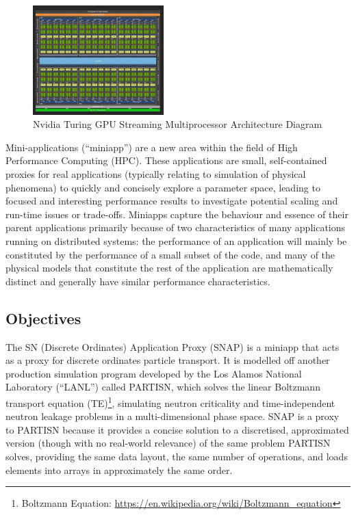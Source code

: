 \documentclass[conference]{IEEEtran}
\begin{document}
\begin{figure}
\centering
\includegraphics[width=0.45\textwidth]{images/gpu_diagram.jpg}
\caption{Nvidia Turing GPU Streaming Multiprocessor Architecture Diagram}
\label{fig:gpu_diagram}
\end{figure}

Mini-applications (``miniapp”) are a new area within the field of High Performance Computing (HPC). These applications are small, self-contained proxies for real applications (typically relating to simulation of physical phenomena) to quickly and concisely explore a parameter space, leading to focused and interesting performance results to investigate potential scaling and run-time issues or trade-offs\cite{miniapps}. Miniapps capture the behaviour and essence of their parent applications primarily because of two characteristics of many applications running on distributed systems: the performance of an application will mainly be constituted by the performance of a small subset of the code, and many of the physical models that constitute the rest of the application are mathematically distinct and generally have similar performance characteristics\cite{miniapps}.

\subsection{Objectives}

The SN (Discrete Ordinates) Application Proxy (SNAP) is a miniapp that acts as a proxy for discrete ordinates particle transport. It is modelled off another production simulation program developed by the Los Alamos National Laboratory (``LANL'') called PARTISN, which solves the linear Boltzmann transport equation (TE)\footnote{Boltzmann Equation: \url{https://en.wikipedia.org/wiki/Boltzmann_equation}\raggedright}, simulating neutron criticality and time-independent neutron leakage problems\cite{partisn} in a multi-dimensional phase space. SNAP is a proxy to PARTISN because it provides a concise solution to a discretised, approximated version (though with no real-world relevance) of the same problem PARTISN solves, providing the same data layout, the same number of operations, and loads elements into arrays in approximately the same order.
\end{document}
